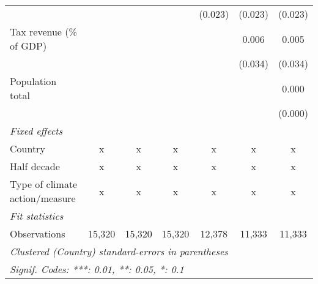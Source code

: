 \begin{tabular}{lcccccc}
                                                        &              &              &              & (0.023)        & (0.023)        & (0.023)\\   
   Tax revenue (\% of GDP)                              &              &              &              &                & 0.006          & 0.005\\   
                                                        &              &              &              &                & (0.034)        & (0.034)\\   
   Population total                                     &              &              &              &                &                & 0.000\\   
                                                        &              &              &              &                &                & (0.000)\\   
   \emph{Fixed effects}\\
   Country                                              & x            & x            & x            & x              & x              & x\\  
   Half decade                                          & x            & x            & x            & x              & x              & x\\  
   Type of climate action/measure                       & x            & x            & x            & x              & x              & x\\  
   \midrule \emph{Fit statistics}\\
   Observations                                         & 15,320       & 15,320       & 15,320       & 12,378         & 11,333         & 11,333\\  
   \midrule
   \multicolumn{7}{l}{\emph{Clustered (Country) standard-errors in parentheses}}\\
   \multicolumn{7}{l}{\emph{Signif. Codes: ***: 0.01, **: 0.05, *: 0.1}}\\
\end{tabular}
\par\endgroup


